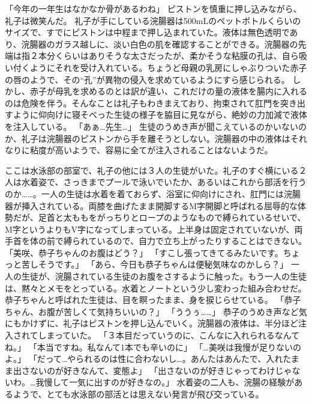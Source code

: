 「今年の一年生はなかなか骨があるわね」
ピストンを慎重に押し込みながら、礼子は微笑んだ。
礼子が手にしている浣腸器は500mLのペットボトルくらいのサイズで、すでにピストンは中程まで押し込まれていた。液体は無色透明であり、浣腸器のガラス越しに、淡い白色の肌を確認することができる。浣腸器の先端は指２本分くらいはありそうな太さだったが、柔かそうな粘膜の孔は、自ら吸い付くようにそれを受け入れている。ちょうど母親の乳房にしゃぶりついた赤子の唇のようで、その“孔”が異物の侵入を求めているようにすら感じられる。
しかし、赤子が母乳を求めるのとは訳が違い、これだけの量の液体を腸内に入れるのは危険を伴う。そんなことは礼子もわきまえており、拘束されて肛門を突き出すように仰向けに寝そべった生徒の様子を脇目に見ながら、絶妙の力加減で液体を注入している。
「あぁ…先生…」
生徒のうめき声が聞こえているのかいないのか、礼子は浣腸器のピストンから手を離そうとしない。浣腸器の中の液体はそれなりに粘度が高いようで、容易に全てが注入されることはないようだ。

ここは水泳部の部室で、礼子の他には３人の生徒がいた。礼子のすぐ横にいる２人は水着姿で、さっきまでプールで泳いでいたか、あるいはこれから部活を行うのか……。一人の生徒は水着を着ておらず、浴室に仰向けにされ、肛門には浣腸器が挿入されている。両膝を曲げたまま開脚するM字開脚と呼ばれる屈辱的な体勢だが、足首と太ももをがっちりとロープのようなもので縛られているせいで、M字というよりもV字になってしまっている。上半身は固定されていないが、両手首を体の前で縛られているので、自力で立ち上がったりすることはできない。
「美咲、恭子ちゃんのお腹はどう？」
「すこし張ってきてるみたいです。ちょっと苦しそうです。」
「あら、今日も恭子ちゃんは便秘気味なのかしら？」
一人の生徒が、浣腸されている生徒のお腹をさするように触った。もう一人の生徒は、黙々とメモをとっている。水着とノートという少し変わった組み合わせだ。恭子ちゃんと呼ばれた生徒は、目を瞑ったまま、身を捩じらせている。
「恭子ちゃん、お腹が苦しくて気持ちいいの？」
「ううぅ……」
恭子のうめき声など気にもかけずに、礼子はピストンを押し込んでいく。浣腸器の液体は、半分ほど注入されてしまっていた。
「３本目だっていうのに、こんなに入れられるなんてね。」
「本当ですね。私なんて1本でも辛いのに」
「…美咲は我慢が足りないのよ。」
「だって…やられるのは性に合わないし…。あんたはあんたで、入れたまま出さないのが好きなんて、変態よ」
「出さないのが好きじゃってわけじゃないわ。…我慢して一気に出すのが好きなの。」
水着姿の二人も、浣腸の経験があるようで、とても水泳部の部活とは思えない発言が飛び交っている。


